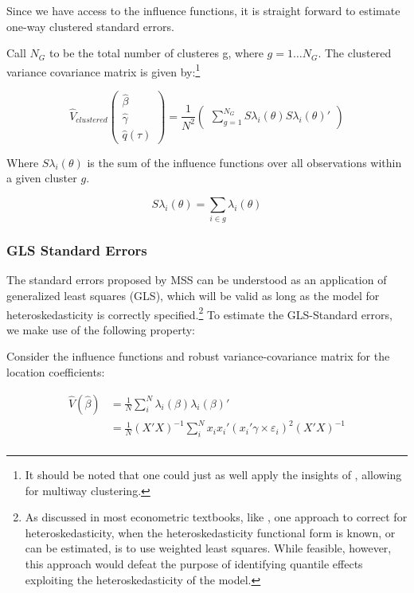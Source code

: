 \documentclass[
  authoryear,
  review,
  1p]{elsarticle}
\begin{document}
Since we have access to the influence functions, it is straight forward
to estimate one-way clustered standard errors.

Call \(N_G\) to be the total number of clusteres g, where
\(g=1\dots N_G\). The clustered variance covariance matrix is given
by:\footnote{It should be noted that one could just as well apply the
  insights of \citet{cameron_robust_2011}, allowing for multiway
  clustering.}

\[\hat{V}_{clustered}
  \begin{pmatrix}
  \hat\beta \\
  \hat\gamma \\
  \hat q(\tau)
  \end{pmatrix}
 = \frac{1}{N^2} 
 \begin{pmatrix}
 \sum_{g=1}^{N_G} S\lambda_i(\theta) S\lambda_i(\theta)'
  \end{pmatrix}
\]

Where \(S\lambda_i(\theta)\) is the sum of the influence functions over
all observations within a given cluster \(g\).

\[S\lambda_i(\theta) = \sum_{i\in g} \lambda_i(\theta)
\]

\subsubsection{GLS Standard Errors}\label{gls-standard-errors}

The standard errors proposed by MSS can be understood as an application
of generalized least squares (GLS), which will be valid as long as the
model for heteroskedasticity is correctly specified.\footnote{As
  discussed in most econometric textbooks, like \citet{cameron2005}, one
  approach to correct for heteroskedasticity, when the
  heteroskedasticity functional form is known, or can be estimated, is
  to use weighted least squares. While feasible, however, this approach
  would defeat the purpose of identifying quantile effects exploiting
  the heteroskedasticity of the model.} To estimate the GLS-Standard
errors, we make use of the following property:

Consider the influence functions and robust variance-covariance matrix
for the location coefficients:

\[\begin{aligned}
\hat V(\hat \beta) &= \frac{1}{N} \sum_i^N \lambda_{i}(\beta) \lambda_{i}(\beta)' \\
&= \frac{1}{N}  (X'X)^{-1}  \sum_i^N x_i x_i' ( x_i'\gamma \times \varepsilon_i)^2 (X'X)^{-1} \\
\end{aligned}
\]
\end{document}
